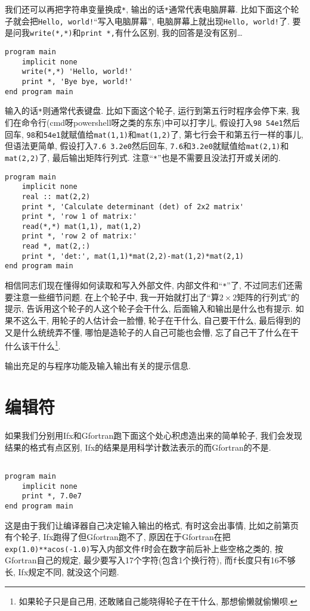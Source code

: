 我们还可以再把字符串变量换成\texttt{*}, 输出的话\texttt{*}通常代表电脑屏幕. 比如下面这个轮子就会把\texttt{Hello, world!}``写入电脑屏幕'', 电脑屏幕上就出现\texttt{Hello, world!}了. 要是问我\texttt{write(*,*)}和\texttt{print *,}有什么区别, 我的回答是没有区别\dots
\begin{lstlisting}
program main
    implicit none
    write(*,*) 'Hello, world!'
    print *, 'Bye bye, world!'
end program main
\end{lstlisting}
输入的话\texttt{*}则通常代表键盘. 比如下面这个轮子, 运行到第五行时程序会停下来, 我们在命令行(cmd呀powershell呀之类的东东)中可以打字儿, 假设打入\texttt{98 54e1}然后回车, \texttt{98}和\texttt{54e1}就赋值给\texttt{mat(1,1)}和\texttt{mat(1,2)}了, 第七行会干和第五行一样的事儿, 但语法更简单, 假设打入\texttt{7.6 3.2e0}然后回车, \texttt{7.6}和\texttt{3.2e0}就赋值给\texttt{mat(2,1)}和\texttt{mat(2,2)}了, 最后输出矩阵行列式. 注意``\texttt{*}''也是不需要且没法打开或关闭的.
\begin{lstlisting}
program main
    implicit none
    real :: mat(2,2)
    print *, 'Calculate determinant (det) of 2x2 matrix'
    print *, 'row 1 of matrix:'
    read(*,*) mat(1,1), mat(1,2)
    print *, 'row 2 of matrix:'
    read *, mat(2,:)
    print *, 'det:', mat(1,1)*mat(2,2)-mat(1,2)*mat(2,1)
end program main
\end{lstlisting}

相信同志们现在懂得如何读取和写入外部文件, 内部文件和``\texttt{*}''了, 不过同志们还需要注意一些细节问题. 在上个轮子中, 我一开始就打出了``算$2\times2$矩阵的行列式''的提示, 告诉用这个轮子的人这个轮子会干什么, 后面输入和输出是什么也有提示. 如果不这么干, 用轮子的人估计会一脸懵, 轮子在干什么, 自己要干什么, 最后得到的又是什么统统弄不懂, 哪怕是造轮子的人自己可能也会懵, 忘了自己干了什么在干什么该干什么\footnote{如果轮子只是自己用, 还敢赌自己能晓得轮子在干什么, 那想偷懒就偷懒呗.}.

\begin{convention}
    输出充足的与程序功能及输入输出有关的提示信息.
\end{convention}

\section{编辑符}\label{fortran_edit_descriptor}

如果我们分别用Ifx和Gfortran跑下面这个处心积虑造出来的简单轮子, 我们会发现结果的格式有点区别, Ifx的结果是用科学计数法表示的而Gfortran的不是.
\begin{lstlisting}

program main
    implicit none
    print *, 7.0e7
end program main
\end{lstlisting}
这是由于我们让编译器自己决定输入输出的格式, 有时这会出事情, 比如之前第\pageref{internal_file}页有个轮子, Ifx跑得了但Gfortran跑不了, 原因在于Gfortran在把\texttt{exp(1.0)**acos(-1.0)}写入内部文件\texttt{f}时会在数字前后补上些空格之类的, 按Gfortran自己的规定, 最少要写入17个字符(包含1个换行符), 而\texttt{f}长度只有16不够长, Ifx规定不同, 就没这个问题.

